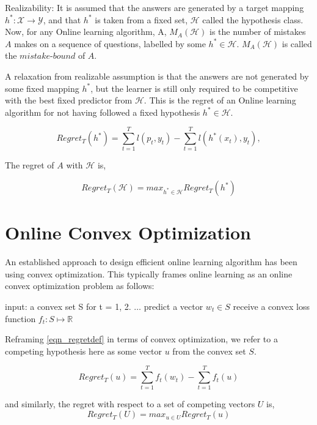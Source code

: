 Realizability: It is assumed that the answers are generated by a target mapping $h^*: \mathcal{X} \rightarrow \mathcal{Y}$, and that $h^*$ is 
taken from a fixed set, $\mathcal{H}$ called the hypothesis class. Now, for any Online learning algorithm, A, $M_A(\mathcal{H})$ is the number 
of mistakes $A$ makes on a sequence of questions, labelled by some $h^* \in \mathcal{H}$. $M_A(\mathcal{H})$ is called the $\textit{mistake-bound}$ 
of $A$.

A relaxation from realizable assumption is that the answers are not generated by some fixed mapping $h^*$, but the learner is still only required 
to be competitive with the best fixed predictor from $\mathcal{H}$. This is the regret of an Online learning algorithm for not having followed a 
fixed hypothesis $h^* \in \mathcal{H}$.

\begin{equation}\label{eqn_regretdef}
    Regret_T(h^*) = \sum_{t=1}^T l(p_t, y_t) - \sum_{t=1}^T l(h^*(x_t), y_t),
\end{equation}

The regret of $A$ with $\mathcal{H}$ is,

\begin{equation}\label{eqn_regretdef}
    Regret_T(\mathcal{H}) = max_{h^* \in \mathcal{H}} Regret_T(h^*)
\end{equation}


\section{Online Convex Optimization}

An established approach to design efficient online learning algorithm has been using convex optimization. This typically frames online learning as an 
online convex optimization problem as follows:

input: a convex set S
for t = 1, 2. $\ldots$
predict a vector $w_t \in S$
receive a convex loss function $f_t: S \mapsto \mathbb{R}$

Reframing \ref{eqn_regretdef} in terms of convex optimization, we refer to a competing hypothesis here as some vector $u$ from the convex set $S$.

\begin{equation}
    Regret_T(u) = \sum_{t=1}^T f_t(w_t) - \sum_{t=1}^T f_t(u)
\end{equation}

and similarly, the regret with respect to a set of competing vectors $U$ is,
\begin{equation}
    Regret_T(U) = max_{u \in U} Regret_T(u)
\end{equation}

